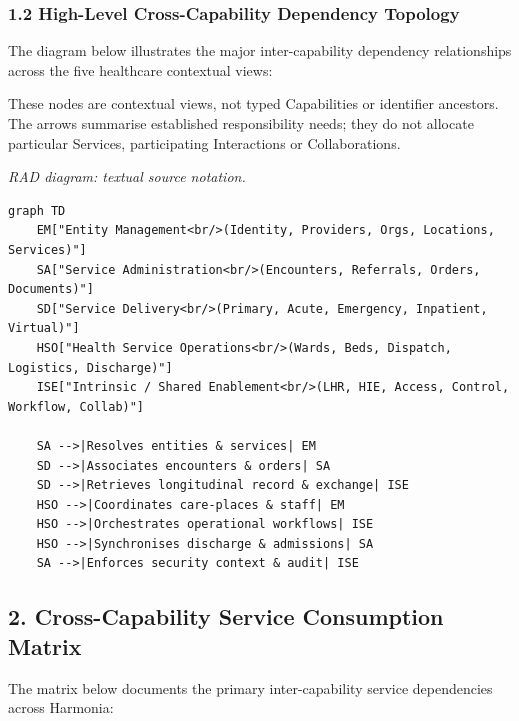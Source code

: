 \subsubsection*{1.2 High-Level Cross-Capability Dependency Topology}
\label{rad:dependencies:23}

The diagram below illustrates the major inter-capability dependency relationships across the five healthcare contextual views:

\label{rad:dependencies:25}

These nodes are contextual views, not typed Capabilities or identifier ancestors. The arrows summarise established responsibility needs; they do not allocate particular Services, participating Interactions or Collaborations.

\label{rad:dependencies:27}

\textit{RAD diagram: textual source notation.}
\begin{Verbatim}[breaklines,fontsize=\footnotesize]
graph TD
    EM["Entity Management<br/>(Identity, Providers, Orgs, Locations, Services)"]
    SA["Service Administration<br/>(Encounters, Referrals, Orders, Documents)"]
    SD["Service Delivery<br/>(Primary, Acute, Emergency, Inpatient, Virtual)"]
    HSO["Health Service Operations<br/>(Wards, Beds, Dispatch, Logistics, Discharge)"]
    ISE["Intrinsic / Shared Enablement<br/>(LHR, HIE, Access, Control, Workflow, Collab)"]

    SA -->|Resolves entities & services| EM
    SD -->|Associates encounters & orders| SA
    SD -->|Retrieves longitudinal record & exchange| ISE
    HSO -->|Coordinates care-places & staff| EM
    HSO -->|Orchestrates operational workflows| ISE
    HSO -->|Synchronises discharge & admissions| SA
    SA -->|Enforces security context & audit| ISE
\end{Verbatim}
\label{rad:dependencies:44}

\par\smallskip
{}\label{rad:dependencies:46}
\subsection*{2. Cross-Capability Service Consumption Matrix}
\label{rad:dependencies:48}

The matrix below documents the primary inter-capability service dependencies across Harmonia:

